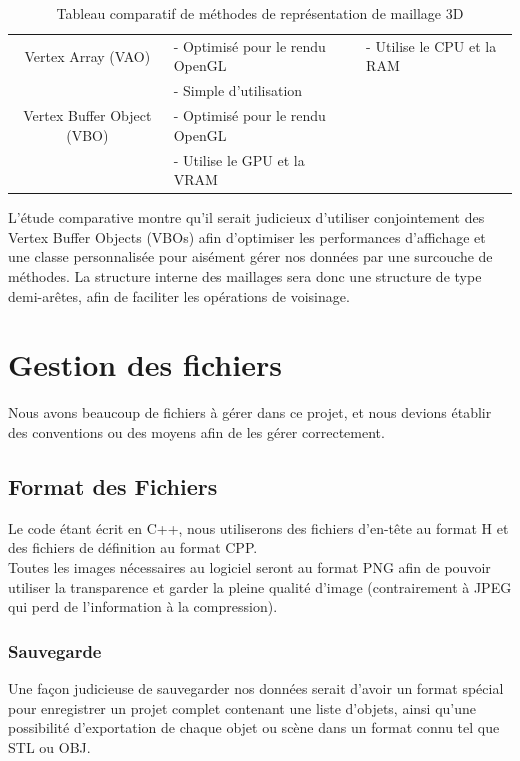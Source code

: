 \documentclass[a4paper]{memoir}
\begin{document}
\begin{table}[H]
\begin{small}
\begin{tabular}{| c | l | l |}
							\hline
							Vertex Array (VAO) & - Optimisé pour le rendu OpenGL & - Utilise le CPU et la RAM\\
							 & - Simple d'utilisation & \\
							\hline
							Vertex Buffer Object (VBO) & - Optimisé pour le rendu OpenGL & \\
							 & - Utilise le GPU et la VRAM & \\
							\hline
						\end{tabular}
					\end{small}
					\label{tab:maillage}
					\caption{Tableau comparatif de méthodes de représentation de maillage 3D}
				\end{table}
				L'étude comparative montre qu'il serait judicieux d'utiliser conjointement des Vertex Buffer Objects (VBOs) afin d'optimiser les 
				performances d'affichage et une classe personnalisée pour aisément gérer nos données par une surcouche de méthodes. La structure interne des 
				maillages sera donc une structure de type demi-arêtes, afin de faciliter les opérations de voisinage.
			
		\section{Gestion des fichiers}
			Nous avons beaucoup de fichiers à gérer dans ce projet, et nous devions établir des conventions ou des moyens afin de les gérer correctement.
			
			\subsection{Format des Fichiers}
				Le code étant écrit en C++, nous utiliserons des fichiers d'en-tête au format H et des fichiers de définition au format CPP.\\
				Toutes les images nécessaires au logiciel seront au format PNG afin de pouvoir utiliser la transparence et garder la pleine qualité d'image 
				(contrairement à JPEG qui perd de l'information à la compression).\\
			
				\subsubsection{Sauvegarde}
					Une façon judicieuse de sauvegarder nos données serait d'avoir un format spécial pour enregistrer un projet complet contenant une liste 
					d'objets, ainsi qu'une possibilité d'exportation de chaque objet ou scène dans un format connu tel que STL ou OBJ.
			
\end{document}
